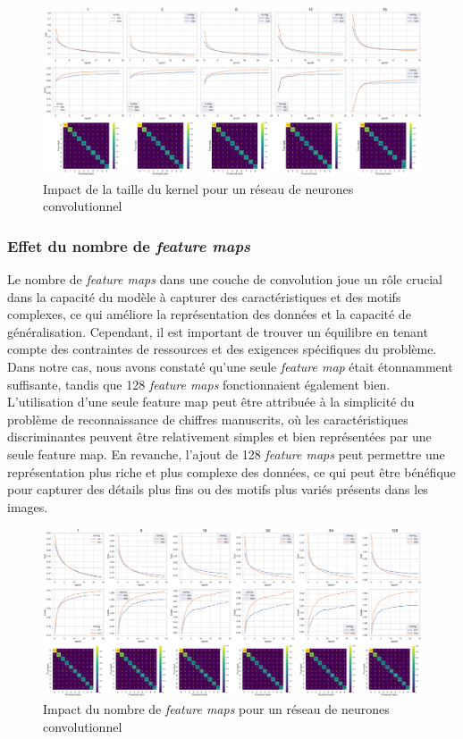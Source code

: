 \documentclass{article}
\begin{document}
\begin{figure}[htbp]
    \centering
    \includegraphics[width=\textwidth]{conv/conv_ksize.pdf}
    \caption{Impact de la taille du kernel pour un réseau de neurones convolutionnel}
    \label{fig:convksize}
\end{figure}

\subsubsection{Effet du nombre de \textit{feature maps}}

Le nombre de \textit{feature maps} dans une couche de convolution joue un rôle crucial dans la capacité du modèle à capturer des caractéristiques et des motifs complexes, ce qui améliore la représentation des données et la capacité de généralisation. Cependant, il est important de trouver un équilibre en tenant compte des contraintes de ressources et des exigences spécifiques du problème. Dans notre cas, nous avons constaté qu'une seule \textit{feature map} était étonnamment suffisante, tandis que 128 \textit{feature maps} fonctionnaient également bien. L'utilisation d'une seule feature map peut être attribuée à la simplicité du problème de reconnaissance de chiffres manuscrits, où les caractéristiques discriminantes peuvent être relativement simples et bien représentées par une seule feature map. En revanche, l'ajout de 128 \textit{feature maps} peut permettre une représentation plus riche et plus complexe des données, ce qui peut être bénéfique pour capturer des détails plus fins ou des motifs plus variés présents dans les images.

\begin{figure}[htbp]
    \centering
    \includegraphics[width=\textwidth]{conv/conv_feature_maps.pdf}
    \caption{Impact du nombre de \textit{feature maps} pour un réseau de neurones convolutionnel}
    \label{fig:convchanout}
\end{figure}
\end{document}

